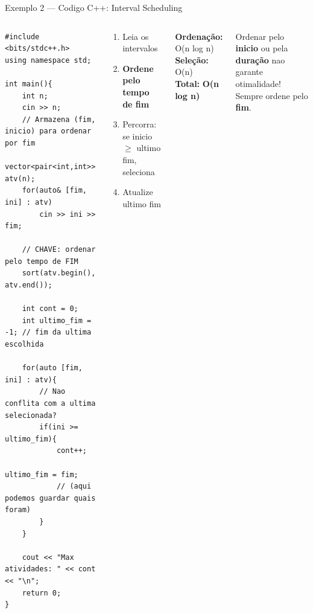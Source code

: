 \documentclass[aspectratio=169,10pt]{beamer}
\begin{document}
\begin{frame}[fragile,shrink=3]{Exemplo 2 --- Codigo C++: Interval Scheduling}
  \begin{columns}[t]
      \begin{tcolorbox}[caixaCodigo]
        \begin{lstlisting}[style=cppstyle]
#include <bits/stdc++.h>
using namespace std;

int main(){
    int n;
    cin >> n;
    // Armazena (fim, inicio) para ordenar por fim
    vector<pair<int,int>> atv(n);
    for(auto& [fim, ini] : atv)
        cin >> ini >> fim;

    // CHAVE: ordenar pelo tempo de FIM
    sort(atv.begin(), atv.end());

    int cont = 0;
    int ultimo_fim = -1; // fim da ultima escolhida

    for(auto [fim, ini] : atv){
        // Nao conflita com a ultima selecionada?
        if(ini >= ultimo_fim){
            cont++;
            ultimo_fim = fim;
            // (aqui podemos guardar quais foram)
        }
    }

    cout << "Max atividades: " << cont << "\n";
    return 0;
}
        \end{lstlisting}
      \end{tcolorbox}
      \begin{tcolorbox}[caixaDourada,title={Passos do algoritmo}]
        \begin{enumerate}\footnotesize
          \item Leia os intervalos
          \item \textbf{Ordene pelo tempo de fim}
          \item Percorra: se inicio $\geq$ ultimo fim, seleciona
          \item Atualize ultimo fim
        \end{enumerate}
      \end{tcolorbox}
      \vspace{0.1cm}
      \begin{tcolorbox}[caixaAzul,title={Complexidade}]
        \footnotesize
        \textbf{Ordenação:} O(n log n)\\
        \textbf{Seleção:} O(n)\\
        \textbf{Total:} \textbf{O(n log n)}
      \end{tcolorbox}
      \vspace{0.1cm}
      \begin{tcolorbox}[caixaVermelho,title={Erro comum}]
        \footnotesize
        Ordenar pelo \textbf{inicio} ou pela
        \textbf{duração} nao garante otimalidade!\\[3pt]
        Sempre ordene pelo \textbf{fim}.
      \end{tcolorbox}
  \end{columns}
\end{frame}
\end{document}
